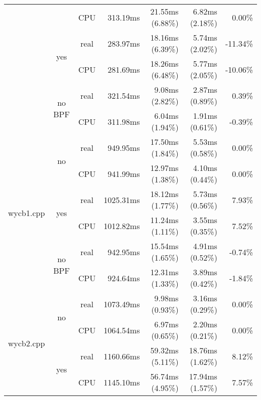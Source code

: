 \documentclass[en]{pracamgr}
\begin{document}
\begin{small}
\begin{longtable}{|l|c|c|r|r|r|r|}
                            &                         & CPU  & 313.19ms & 21.55ms (6.88\%) & 6.82ms (2.18\%) & 0.00\% \\*
                            \cline{2-7}
                            & \multirow{2}{*}{yes}    & real & 283.97ms & 18.16ms (6.39\%) & 5.74ms (2.02\%) & -11.34\% \\*
                            &                         & CPU  & 281.69ms & 18.26ms (6.48\%) & 5.77ms (2.05\%) & -10.06\% \\*
                            \cline{2-7}
                            & \multirow{2}{*}{no BPF} & real & 321.54ms & 9.08ms (2.82\%) & 2.87ms (0.89\%) & 0.39\% \\*
                            &                         & CPU  & 311.98ms & 6.04ms (1.94\%) & 1.91ms (0.61\%) & -0.39\% \\
\hline
\multirow{6}{*}{wycb1.cpp}  & \multirow{2}{*}{no}     & real & 949.95ms & 17.50ms (1.84\%) & 5.53ms (0.58\%) & 0.00\% \\*
                            &                         & CPU  & 941.99ms & 12.97ms (1.38\%) & 4.10ms (0.44\%) & 0.00\% \\*
                            \cline{2-7}
                            & \multirow{2}{*}{yes}    & real & 1025.31ms & 18.12ms (1.77\%) & 5.73ms (0.56\%) & 7.93\% \\*
                            &                         & CPU  & 1012.82ms & 11.24ms (1.11\%) & 3.55ms (0.35\%) & 7.52\% \\*
                            \cline{2-7}
                            & \multirow{2}{*}{no BPF} & real & 942.95ms & 15.54ms (1.65\%) & 4.91ms (0.52\%) & -0.74\% \\*
                            &                         & CPU  & 924.64ms & 12.31ms (1.33\%) & 3.89ms (0.42\%) & -1.84\% \\
\hline
\multirow{6}{*}{wycb2.cpp}  & \multirow{2}{*}{no}     & real & 1073.49ms & 9.98ms (0.93\%) & 3.16ms (0.29\%) & 0.00\% \\*
                            &                         & CPU  & 1064.54ms & 6.97ms (0.65\%) & 2.20ms (0.21\%) & 0.00\% \\*
                            \cline{2-7}
                            & \multirow{2}{*}{yes}    & real & 1160.66ms & 59.32ms (5.11\%) & 18.76ms (1.62\%) & 8.12\% \\*
                            &                         & CPU  & 1145.10ms & 56.74ms (4.95\%) & 17.94ms (1.57\%) & 7.57\% \\*

\end{longtable}
\end{small}
\end{document}
